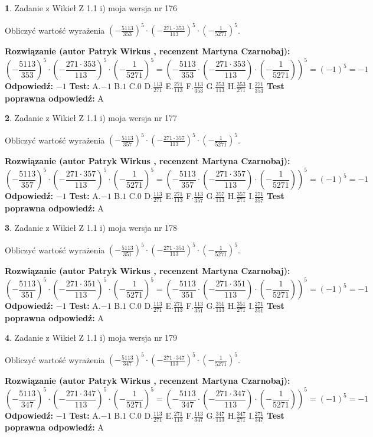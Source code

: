 \documentclass[12pt, a4paper]{article}
\theoremstyle{definition} %
\newtheorem{zad}{}
\newcommand{\zadStart}[1]{\begin{zad}#1\newline}
\newcommand{\zadStop}{\end{zad}}
\newcommand{\rozwStart}[2]{\noindent \textbf{Rozwiązanie (autor #1 , recenzent #2): }\newline}
\newcommand{\rozwStop}{\newline}
\newcommand{\odpStart}{\noindent \textbf{Odpowiedź:}\newline}
\newcommand{\odpStop}{\newline}
\newcommand{\testStart}{\noindent \textbf{Test:}\newline}
\newcommand{\testStop}{\newline}
\newcommand{\kluczStart}{\noindent \textbf{Test poprawna odpowiedź:}\newline}
\newcommand{\kluczStop}{\newline}
\begin{document}
\zadStart{Zadanie z Wikieł Z 1.1 i) moja wersja nr 176}

Obliczyć wartość wyrażenia $(-\frac{5113}{353})^{5} \cdot (-\frac{271 \cdot 353}{113})^{5} \cdot (-\frac{1}{5271})^{5}$.
\zadStop
\rozwStart{Patryk Wirkus}{Martyna Czarnobaj}
$$(-\frac{5113}{353})^{5} \cdot (-\frac{271 \cdot 353}{113})^{5} \cdot (-\frac{1}{5271})^{5} = (-\frac{5113}{353} \cdot (-\frac{271 \cdot 353}{113}) \cdot (-\frac{1}{5271}))^{5} = (-1)^{5} = -1$$
\rozwStop
\odpStart
$-1$
\odpStop
\testStart
A.$-1$ B.$1$ C.$0$ D.$\frac{113}{271}$ E.$\frac{271}{113}$
F.$\frac{113}{353}$ G.$\frac{353}{113}$
H.$\frac{353}{271}$
I.$\frac{271}{353}$
\testStop
\kluczStart
A
\kluczStop



\zadStart{Zadanie z Wikieł Z 1.1 i) moja wersja nr 177}

Obliczyć wartość wyrażenia $(-\frac{5113}{357})^{5} \cdot (-\frac{271 \cdot 357}{113})^{5} \cdot (-\frac{1}{5271})^{5}$.
\zadStop
\rozwStart{Patryk Wirkus}{Martyna Czarnobaj}
$$(-\frac{5113}{357})^{5} \cdot (-\frac{271 \cdot 357}{113})^{5} \cdot (-\frac{1}{5271})^{5} = (-\frac{5113}{357} \cdot (-\frac{271 \cdot 357}{113}) \cdot (-\frac{1}{5271}))^{5} = (-1)^{5} = -1$$
\rozwStop
\odpStart
$-1$
\odpStop
\testStart
A.$-1$ B.$1$ C.$0$ D.$\frac{113}{271}$ E.$\frac{271}{113}$
F.$\frac{113}{357}$ G.$\frac{357}{113}$
H.$\frac{357}{271}$
I.$\frac{271}{357}$
\testStop
\kluczStart
A
\kluczStop



\zadStart{Zadanie z Wikieł Z 1.1 i) moja wersja nr 178}

Obliczyć wartość wyrażenia $(-\frac{5113}{351})^{5} \cdot (-\frac{271 \cdot 351}{113})^{5} \cdot (-\frac{1}{5271})^{5}$.
\zadStop
\rozwStart{Patryk Wirkus}{Martyna Czarnobaj}
$$(-\frac{5113}{351})^{5} \cdot (-\frac{271 \cdot 351}{113})^{5} \cdot (-\frac{1}{5271})^{5} = (-\frac{5113}{351} \cdot (-\frac{271 \cdot 351}{113}) \cdot (-\frac{1}{5271}))^{5} = (-1)^{5} = -1$$
\rozwStop
\odpStart
$-1$
\odpStop
\testStart
A.$-1$ B.$1$ C.$0$ D.$\frac{113}{271}$ E.$\frac{271}{113}$
F.$\frac{113}{351}$ G.$\frac{351}{113}$
H.$\frac{351}{271}$
I.$\frac{271}{351}$
\testStop
\kluczStart
A
\kluczStop



\zadStart{Zadanie z Wikieł Z 1.1 i) moja wersja nr 179}

Obliczyć wartość wyrażenia $(-\frac{5113}{347})^{5} \cdot (-\frac{271 \cdot 347}{113})^{5} \cdot (-\frac{1}{5271})^{5}$.
\zadStop
\rozwStart{Patryk Wirkus}{Martyna Czarnobaj}
$$(-\frac{5113}{347})^{5} \cdot (-\frac{271 \cdot 347}{113})^{5} \cdot (-\frac{1}{5271})^{5} = (-\frac{5113}{347} \cdot (-\frac{271 \cdot 347}{113}) \cdot (-\frac{1}{5271}))^{5} = (-1)^{5} = -1$$
\rozwStop
\odpStart
$-1$
\odpStop
\testStart
A.$-1$ B.$1$ C.$0$ D.$\frac{113}{271}$ E.$\frac{271}{113}$
F.$\frac{113}{347}$ G.$\frac{347}{113}$
H.$\frac{347}{271}$
I.$\frac{271}{347}$
\testStop
\kluczStart
A
\kluczStop
\end{document}
